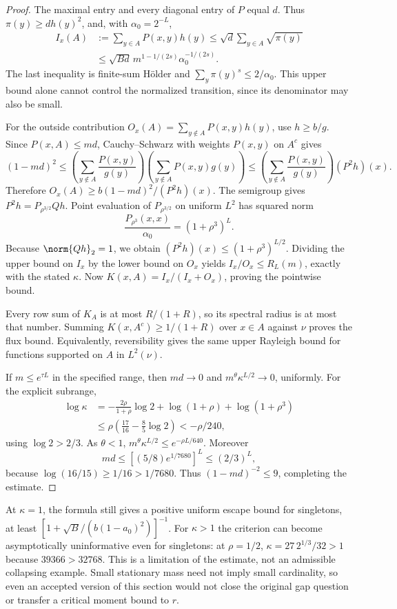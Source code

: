 \begin{proof}
The maximal entry and every diagonal entry of $P$ equal $d$. Thus $\pi(y)\geq d h(y)^2$, and, with $\alpha_0=2^{-L}$,
\begin{align*}
 I_x(A)&:=\sum_{y\in A}P(x,y)h(y)
 \leq\sqrt d\sum_{y\in A}\sqrt{\pi(y)}\\
 &\leq\sqrt{Bd}\,m^{1-1/(2s)}\alpha_0^{-1/(2s)}.
\end{align*}
The last inequality is finite-sum H\"older and $\sum_y\pi(y)^s\leq2/\alpha_0$. This upper bound alone cannot control the normalized transition, since its denominator may also be small.

For the outside contribution $O_x(A)=\sum_{y\notin A}P(x,y)h(y)$, use $h\geq b/g$. Since $P(x,A)\leq md$, Cauchy--Schwarz with weights $P(x,y)$ on $A^c$ gives
\[
 (1-md)^2\leq
 \left(\sum_{y\notin A}\frac{P(x,y)}{g(y)}\right)
 \left(\sum_{y\notin A}P(x,y)g(y)\right)
 \leq\left(\sum_{y\notin A}\frac{P(x,y)}{g(y)}\right)(P^2h)(x).
\]
Therefore $O_x(A)\geq b(1-md)^2/(P^2h)(x)$. The semigroup gives $P^2h=P_{\rho^{3/2}}Qh$. Point evaluation of $P_{\rho^{3/2}}$ on uniform $L^2$ has squared norm
\[
 \frac{P_{\rho^3}(x,x)}{\alpha_0}=(1+\rho^3)^L.
\]
Because $\norm{Qh}_2=1$, we obtain $(P^2h)(x)\leq(1+\rho^3)^{L/2}$. Dividing the upper bound on $I_x$ by the lower bound on $O_x$ yields $I_x/O_x\leq R_L(m)$, exactly with the stated $\kappa$. Now $K(x,A)=I_x/(I_x+O_x)$, proving the pointwise bound.

Every row sum of $K_A$ is at most $R/(1+R)$, so its spectral radius is at most that number. Summing $K(x,A^c)\geq1/(1+R)$ over $x\in A$ against $\nu$ proves the flux bound. Equivalently, reversibility gives the same upper Rayleigh bound for functions supported on $A$ in $L^2(\nu)$.

If $m\leq e^{\tau L}$ in the specified range, then $md\to0$ and $m^\theta\kappa^{L/2}\to0$, uniformly. For the explicit subrange,
\begin{align*}
 \log\kappa
 &=-\frac{2\rho}{1+\rho}\log2+\log(1+\rho)+\log(1+\rho^3)\\
 &\leq\rho\left(\frac{17}{16}-\frac85\log2\right)
 <-\rho/240,
\end{align*}
using $\log2>2/3$. As $\theta<1$, $m^\theta\kappa^{L/2}\leq e^{-\rho L/640}$. Moreover
\[
 md\leq[(5/8)e^{1/7680}]^L\leq(2/3)^L,
\]
because $\log(16/15)\geq1/16>1/7680$. Thus $(1-md)^{-2}\leq9$, completing the estimate.
\end{proof}

At $\kappa=1$, the formula still gives a positive uniform escape bound for singletons, at least $[1+\sqrt B/(b(1-a_0)^2)]^{-1}$. For $\kappa>1$ the criterion can become asymptotically uninformative even for singletons: at $\rho=1/2$, $\kappa=27\,2^{1/3}/32>1$ because $39366>32768$. This is a limitation of the estimate, not an admissible collapsing example. Small stationary mass need not imply small cardinality, so even an accepted version of this section would not close the original gap question or transfer a critical moment bound to $r$.
